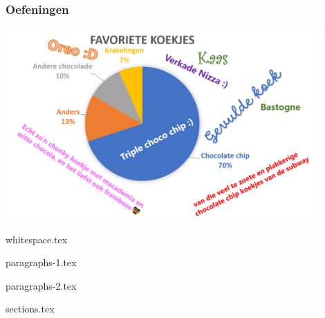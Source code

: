 \documentclass[allauthors,dutch]{../../cursuspresentatie}
\def\importslide#1#2{%
	{#2}
}
\begin{document}

\begin{frame}
	\frametitle{Oefeningen}
	
	\centering
	
	\includegraphics[width=0.9\textwidth,height=0.85\textheight,keepaspectratio]{images/cookie_art.png}
\end{frame}


\importslide{beginners_NL}{whitespace.tex}


\importslide{text}{paragraphs-1.tex}

\importslide{text}{paragraphs-2.tex}


\importslide{beginners_NL}{sections.tex}

\end{document}
